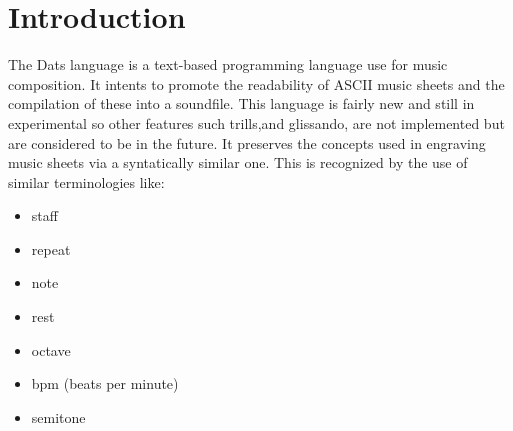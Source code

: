 \section{Introduction}
\renewcommand\frelo{\S\thesubsection}
\setcounter{page}{4}
\np The Dats language is a text-based programming language use for music composition.
It intents to promote the readability of ASCII music sheets and the compilation of these into
 a soundfile.
This language is fairly new and still in experimental so other features such trills,and glissando, are not implemented but are considered to be in the future. It preserves the
concepts used in engraving music sheets via a syntatically similar one. This is
recognized by the use of similar terminologies like:

\begin{multicols}{2}
\begin{itemize}
\renewcommand{\labelitemi}{--}
\item staff
\item repeat
\item note
\item rest
\item octave
\item bpm (beats per minute)
\item semitone
\end{itemize}
\end{multicols}

\np 
